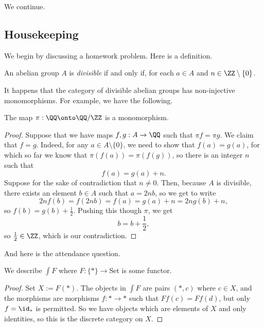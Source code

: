 \documentclass[../notes.tex]{subfiles}
\begin{document}

We continue.

\subsection{Housekeeping}
We begin by discussing a homework problem. Here is a definition.
\begin{definition}[Divisible]
	An abelian group $A$ is \textit{divisible} if and only if, for each $a\in A$ and $n\in\ZZ\setminus\{0\}$.
\end{definition}
It happens that the category of divisible abelian groups has non-injective monomorphisms. For example, we have the following.
\begin{exe}
	The map $\pi:\QQ\onto\QQ/\ZZ$ is a monomorphism.
\end{exe}
\begin{proof}
	Suppose that we have maps $f,g:A\to\QQ$ such that $\pi f=\pi g$. We claim that $f=g$. Indeed, for any $a\in A\setminus\{0\}$, we need to show that $f(a)=g(a)$, for which so far we know that $\pi(f(a))=\pi(f(g))$, so there is an integer $n$ such that
	\[f(a)=g(a)+n.\]
	Suppose for the sake of contradiction that $n\ne0$. Then, because $A$ is divisible, there exists an element $b\in A$ such that $a=2nb$, so we get to write
	\[2nf(b)=f(2nb)=f(a)=g(a)+n=2ng(b)+n,\]
	so $f(b)=g(b)+\frac12$. Pushing this though $\pi$, we get
	\[b=b+\frac12,\]
	so $\frac12\in\ZZ$, which is our contradiction.
\end{proof}

And here is the attendance question.
\begin{exe}
	We describe $\int F$ where $F:\{*\}\to\mathrm{Set}$ is some functor.
\end{exe}
\begin{proof}
	Set $X:=F(*)$. The objects in $\int F$ are pairs $(*,c)$ where $c\in X$, and the morphisms are morphisms $f:*\to*$ such that $Ff(c)=Ff(d)$, but only $f=\id_*$ is permitted. So we have objects which are elements of $X$ and only identities, so this is the discrete category on $X$.
\end{proof}
\end{document}
